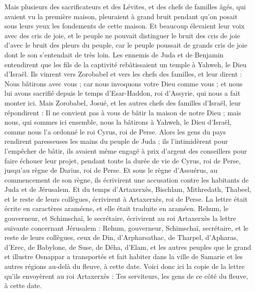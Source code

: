 \begin{multicols}{2}
Mais plusieurs des sacrificateurs et des Lévites, et des chefs de familles âgés, qui avaient vu la première maison, pleuraient à grand bruit pendant qu'on posait sous leurs yeux les fondements de cette maison. Et beaucoup élevaient leur voix avec des cris de joie,
et le peuple ne pouvait distinguer le bruit des cris de joie  d'avec le bruit des pleurs du peuple, car le peuple poussait de grands cris de joie dont le son s’entendait de très loin.
\VerseOne{}Les ennemis de Juda et de Benjamin entendirent que les fils de la captivité rebâtissaient un temple à Yahweh, le Dieu d'Israël.
Ils vinrent vers Zorobabel et vers les chefs des familles, et leur dirent : Nous bâtirons avec vous ; car nous invoquons votre Dieu comme vous ; et nous lui avons sacrifié depuis le temps d'Esar-Haddon, roi d'Assyrie, qui nous a fait monter ici.
Mais Zorobabel, Josué, et les autres chefs des familles d'Israël, leur répondirent : Il ne convient pas à vous de bâtir la maison de notre Dieu ; mais nous, qui sommes ici ensemble, nous la bâtirons à Yahweh, le Dieu d'Israël, comme nous l'a ordonné le roi Cyrus, roi de Perse.
Alors les gens du pays rendirent paresseuses les mains du peuple de Juda ; ils l’intimidèrent pour l'empêcher de bâtir,
ils avaient même engagé à prix d’argent des conseillers pour faire échouer leur projet, pendant toute la durée de vie de Cyrus, roi de Perse, jusqu'au règne de Darius, roi de Perse.
Et sous le règne d'Assuérus, au commencement de son règne, ils écrivirent une accusation contre les habitants de Juda et de Jérusalem.
Et du temps d'Artaxerxès, Bischlam, Mithredath, Thabeel, et le reste de leurs collègues, écrivirent à Artaxerxès, roi de Perse. La lettre était écrite en caractères araméens, et elle était traduite en araméen.
Rehum, le gouverneur, et Schimschaï, le secrétaire, écrivirent au roi Artaxerxès la lettre suivante concernant Jérusalem :
Rehum, gouverneur, Schimschaï, secrétaire, et le reste de leurs collègues, ceux de Din, d'Arpharsathac, de Tharpel, d'Apharas, d'Erec, de Babylone, de Suse, de Déha, d'Elam,
et les autres peuples que le grand et illustre Osnappar a transportés et fait habiter dans la ville de Samarie et les autres régions au-delà du fleuve, à cette date.
Voici donc ici la copie de la lettre qu'ils envoyèrent au roi Artaxerxès : Tes serviteurs, les gens de ce côté du fleuve, à cette date.

\end{multicols}
